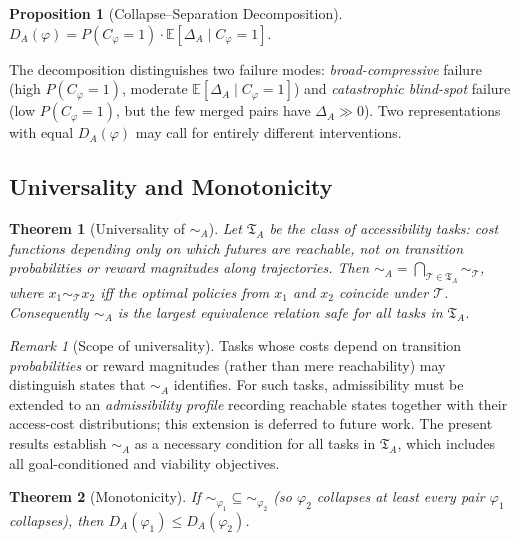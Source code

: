 \documentclass[10pt,twocolumn]{article}
\theoremstyle{plain}
\newtheorem{theorem}{Theorem}
\newtheorem{proposition}{Proposition}
\theoremstyle{definition}
\theoremstyle{remark}
\newtheorem{remark}{Remark}
\newcommand{\simA}{\sim_{\!A}}
\newcommand{\DA}{D_{A}(\varphi)}
\begin{document}
\begin{proposition}[Collapse--Separation Decomposition]
\label{prop:decomp}
$\DA = P(C_\varphi=1)\cdot\mathbb{E}[\Delta_A\mid C_\varphi=1].$
\end{proposition}

The decomposition distinguishes two failure modes: \emph{broad-compressive} failure
(high $P(C_\varphi=1)$, moderate $\mathbb{E}[\Delta_A\mid C_\varphi=1]$) and
\emph{catastrophic blind-spot} failure (low $P(C_\varphi=1)$, but the few merged
pairs have $\Delta_A\gg 0$). Two representations with equal $\DA$ may call for
entirely different interventions.

\subsection{Universality and Monotonicity}

\begin{theorem}[Universality of $\simA$]
\label{thm:universality}
Let $\mathfrak{T}_A$ be the class of \emph{accessibility tasks}: cost functions
depending only on which futures are reachable, not on transition probabilities or
reward magnitudes along trajectories. Then
$\simA = \bigcap_{\mathcal{T}\in\mathfrak{T}_A}\sim_{\mathcal{T}}$,
where $x_1\sim_\mathcal{T} x_2$ iff the optimal policies from $x_1$ and $x_2$
coincide under $\mathcal{T}$. Consequently $\simA$ is the largest equivalence
relation safe for all tasks in $\mathfrak{T}_A$.
\end{theorem}

\begin{remark}[Scope of universality]
Tasks whose costs depend on transition \emph{probabilities} or reward magnitudes
(rather than mere reachability) may distinguish states that $\simA$ identifies.
For such tasks, admissibility must be extended to an \emph{admissibility profile}
recording reachable states together with their access-cost distributions; this
extension is deferred to future work. The present results establish $\simA$ as a
necessary condition for all tasks in $\mathfrak{T}_A$, which includes all
goal-conditioned and viability objectives.
\end{remark}

\begin{theorem}[Monotonicity]
\label{thm:monotone}
If ${\sim_{\varphi_1}}\subseteq{\sim_{\varphi_2}}$ (so $\varphi_2$ collapses at
least every pair $\varphi_1$ collapses), then $D_A(\varphi_1)\leq D_A(\varphi_2)$.
\end{theorem}
\end{document}
